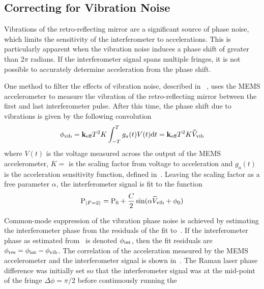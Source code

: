 \subsection{Correcting for Vibration Noise}\label{sec:vibration_senstivity}
Vibrations of the retro-reflecting mirror are a significant source of
phase noise, which limits the sensitivity of the interferometer to
accelerations. This is particularly apparent when the vibration noise
induces a phase shift of greater than 2\(\pi\) radians. If the
interferometer signal spans multiple fringes, it is not possible to
accurately determine acceleration from the phase shift.
\par\noindent
One method to filter the effects of vibration noise, described in
~\cite{Merlet2009}, uses the MEMS accelerometer to measure the
vibration of the retro-reflecting mirror between the
first and last interferometer pulse. After this time, the phase shift
due to vibrations is given by the following convolution
\begin{equation}
  \phi_\textnormal{vib} =  {\textbf k_\textnormal{eff}} T^2 K\int_{-T}^{T} g_a (t) V(t)
  \mathrm{d}t = {\textbf k_\textnormal{eff}} T^2 K
  \widetilde{V}_\textnormal{vib}
  \label{eq:phase_vib}
\end{equation}
where \(V(t)\) is the voltage measured across the output of the MEMS
accelerometer, \(K = \)  is the
scaling factor from voltage to acceleration and \(g_a(t)\) is the
acceleration sensitivity function, defined
in~. Leaving the scaling factor as a
free parameter $\alpha$, the interferometer signal is
fit to the function
\begin{equation}
  \text{P}_{\ket{F=2}} = \text{P}_0 + \frac{C}{2}\sin(\alpha
  \widetilde{V}_\textnormal{vib} + \phi_0)
  \label{eq:fringe_fit_vibration}
\end{equation}
\par\noindent
Common-mode suppression of the vibration phase noise is achieved by
estimating the interferometer phase from the residuals of the fit
to~. If the interferometer phase
as estimated from~ is denoted
\(\phi_\textnormal{int}\), then the fit residuals are
\(\phi_\textnormal{res} =  \phi_\textnormal{int} -
\phi_\textnormal{vib}\).
The correlation of the acceleration measured by the MEMS accelerometer
and the interferometer signal is shown
in~. The Raman laser phase difference was
initially set so that the interferometer signal was at the mid-point
of the fringe \(\Delta \phi = \pi/2\) before continuously running the
